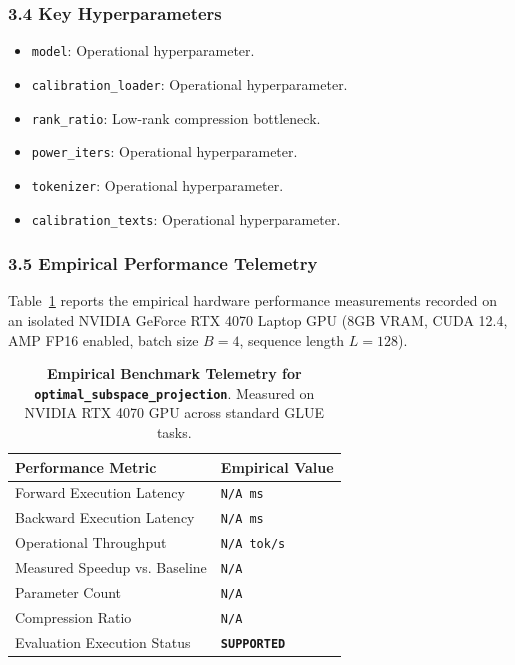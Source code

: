 \subsubsection*{3.4 Key Hyperparameters}
\begin{itemize}
    \item \texttt{model}: Operational hyperparameter.
    \item \texttt{calibration\_loader}: Operational hyperparameter.
    \item \texttt{rank\_ratio}: Low-rank compression bottleneck.
    \item \texttt{power\_iters}: Operational hyperparameter.
    \item \texttt{tokenizer}: Operational hyperparameter.
    \item \texttt{calibration\_texts}: Operational hyperparameter.
\end{itemize}

\subsubsection*{3.5 Empirical Performance Telemetry}
Table~\ref{tab:telemetry_optimal_subspace_projection} reports the empirical hardware performance measurements recorded on an isolated NVIDIA GeForce RTX 4070 Laptop GPU (8GB VRAM, CUDA 12.4, AMP FP16 enabled, batch size $B=4$, sequence length $L=128$).

\begin{table}[h]
\centering
\small
\caption{\textbf{Empirical Benchmark Telemetry for \texttt{optimal\_subspace\_projection}}. Measured on NVIDIA RTX 4070 GPU across standard GLUE tasks.}
\label{tab:telemetry_optimal_subspace_projection}
\begin{tabularx}{\columnwidth}{lX}
\toprule
\textbf{Performance Metric} & \textbf{Empirical Value} \\
\midrule
Forward Execution Latency & \texttt{N/A ms} \\
Backward Execution Latency & \texttt{N/A ms} \\
Operational Throughput & \texttt{N/A tok/s} \\
Measured Speedup vs. Baseline & \texttt{N/A} \\
Parameter Count & \texttt{N/A} \\
Compression Ratio & \texttt{N/A} \\
Evaluation Execution Status & \textbf{\texttt{SUPPORTED}} \\
\bottomrule
\end{tabularx}
\end{table}

